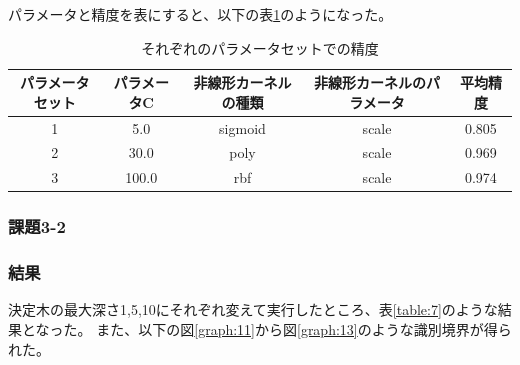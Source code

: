 パラメータと精度を表にすると、以下の表\ref{table:6}のようになった。
\begin{table}[hbtp]
  \centering
  \caption{それぞれのパラメータセットでの精度}
  \label{table:6}
  \begin{tabular}{|c|c|c|c|c|}
    \hline
    パラメータセット&パラメータC & 非線形カーネルの種類 & 非線形カーネルのパラメータ & 平均精度\\
    \hline
    1&5.0 & sigmoid & scale &  0.805 \\
    2&30.0 & poly & scale &  0.969  \\
    3&100.0 & rbf & scale &  0.974 \\
    \hline
  \end{tabular}
\end{table}
\clearpage
\subsubsection{課題3-2}
\subsubsection{結果}
決定木の最大深さ1,5,10にそれぞれ変えて実行したところ、表\ref{table:7}のような結果となった。
また、以下の図\ref{graph:11}から図\ref{graph:13}のような識別境界が得られた。

